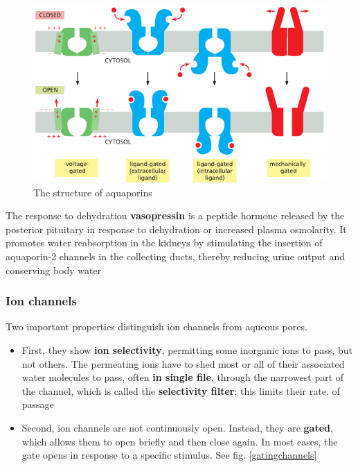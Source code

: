 \documentclass[../main.tex]{subfiles}
\begin{document}
\begin{figure}[H]
	\centering
	\includegraphics[width = 0.7 \textwidth]{20}
	\caption{The structure of aquaporins}
	\label{aquaporins}
\end{figure}

\begin{RemarkWithTitel}{The response to dehydration}
	\textbf{\gls{vasopressin}} is a peptide hormone released by the posterior pituitary in response to dehydration or increased plasma osmolarity. It promotes water reabsorption in the kidneys by stimulating the insertion of aquaporin-2 channels in the collecting ducts, thereby reducing urine output and conserving body water
\end{RemarkWithTitel}

\subsubsection{Ion channels}
Two important properties distinguish ion channels from aqueous pores.
\begin{itemize}
	\item  First, they show \textbf{ion selectivity}, permitting some inorganic ions to pass, but not others. The permeating ions have to shed most or all of their associated water molecules to pass, often \textbf{in single file}, through the narrowest part of the channel, which is called the \textbf{selectivity filter}; this limits their rate. 
	of passage
	
	\item Second, ion channels are not continuously open. Instead, they are \textbf{gated}, which allows them to open briefly and then close again. In most cases, the gate opens in response 
	to a specific stimulus. See fig. \ref{gatingchannels}
\end{itemize} 
\end{document}
